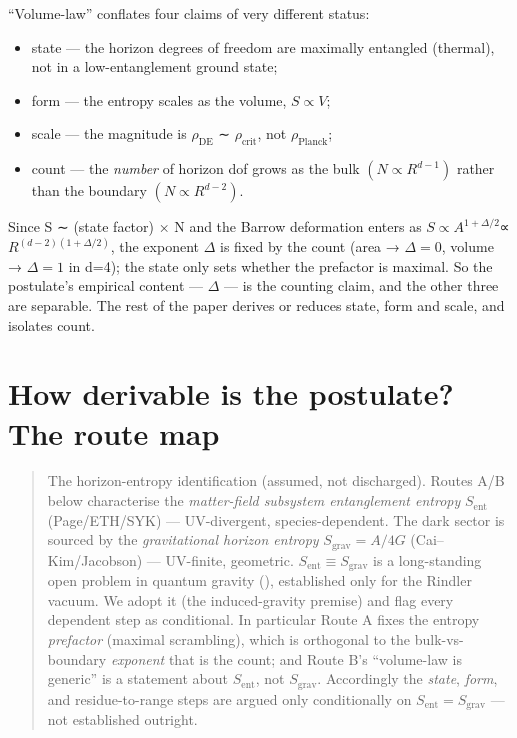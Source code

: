 \documentclass[aps,prd,preprint,nofootinbib,superscriptaddress]{revtex4-2}
\providecommand{\tightlist}{\setlength{\itemsep}{0pt}\setlength{\parskip}{0pt}}
\begin{document}
``Volume-law'' conflates four claims of very different status:

\begin{itemize}
\tightlist
\item
  state --- the horizon degrees of freedom are maximally entangled
  (thermal), not in a low-entanglement ground state;
\item
  form --- the entropy scales as the volume, \(S \propto  V\);
\item
  scale --- the magnitude is \(\rho _\mathrm{DE}\) ∼
  \(\rho _{\mathrm{crit}}\), not \(\rho _{\mathrm{Planck}}\);
\item
  count --- the \emph{number} of horizon dof grows as the bulk
  \((N \propto  R^{d-1})\) rather than the boundary
  \((N \propto  R^{d-2})\).
\end{itemize}

Since S ∼ (state factor) × N and the Barrow deformation enters as
\(S \propto  A^{1+\Delta /2}\)∝ \(R^{(d-2)(1+\Delta /2)}\), the exponent
\(\Delta\) is fixed by the count (area → \(\Delta =0\), volume →
\(\Delta =1\) in d=4); the state only sets whether the prefactor is
maximal. So the postulate's empirical content --- \(\Delta\) --- is the
counting claim, and the other three are separable. The rest of the paper
derives or reduces state, form and scale, and isolates count.

\section{How derivable is the postulate? The route map}\label{sec-3}

\begin{quote}
The horizon-entropy identification (assumed, not discharged). Routes A/B
below characterise the \emph{matter-field subsystem entanglement
entropy} \(S_{\mathrm{ent}}\) (Page/ETH/SYK) --- UV-divergent,
species-dependent. The dark sector is sourced by the \emph{gravitational
horizon entropy} \(S_{\mathrm{grav}} = A/4G\) (Cai--Kim/Jacobson) ---
UV-finite, geometric. \(S_{\mathrm{ent}} \equiv  S_{\mathrm{grav}}\) is
a long-standing open problem in quantum gravity
(\cite{Bombelli:1986rw, Susskind:1994sm}), established only for the
Rindler vacuum. We adopt it (the induced-gravity premise) and flag every
dependent step as conditional. In particular Route A fixes the entropy
\emph{prefactor} (maximal scrambling), which is orthogonal to the
bulk-vs-boundary \emph{exponent} that is the count; and Route B's
``volume-law is generic'' is a statement about \(S_{\mathrm{ent}}\), not
\(S_{\mathrm{grav}}\). Accordingly the \emph{state}, \emph{form}, and
residue-to-range steps are argued only conditionally on
\(S_{\mathrm{ent}} = S_{\mathrm{grav}}\) --- not established outright.
\end{quote}
\end{document}
